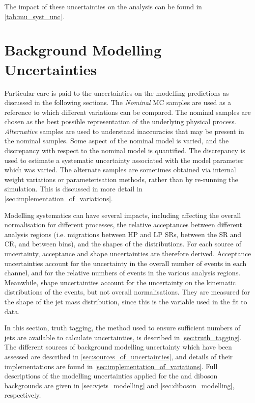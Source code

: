 The impact of these uncertainties on the analysis can be found in \cref{tab:mu_syst_unc}.



\section{Background Modelling Uncertainties}\label{sec:vhbb_modelling}

Particular care is paid to the uncertainties on the modelling predictions as discussed in the following sections.
The \textit{Nominal} MC samples are used as a reference to which different variations can be compared.
The nominal samples are chosen as the best possible representation of the underlying physical process.
\textit{Alternative} samples are used to understand inaccuracies that may be present in the nominal samples.
Some aspect of the nominal model is varied, and the discrepancy with respect to the nominal model is quantified.
The discrepancy is used to estimate a systematic uncertainty associated with the model parameter which was varied.
The alternate samples are sometimes obtained via internal weight variations or parameterisation methods, rather than by re-running the simulation.
This is discussed in more detail in \cref{sec:implementation_of_variations}.

Modelling systematics can have several impacts, including affecting the overall normalisation for different processes, the relative acceptances between different analysis regions (i.e. migrations between HP and LP SRs, between the SR and CR, and between \pTV bins), and the shapes of the \mJ distributions.
For each source of uncertainty, acceptance and shape uncertainties are therefore derived.
Acceptance uncertainties account for the uncertainty in the overall number of events in each channel, and for the relative numbers of events in the various analysis regions.
Meanwhile, shape uncertainties account for the uncertainty on the kinematic distributions of the events, but not overall normalisations.
They are measured for the shape of the \largeR jet mass distribution, since this is the variable used in the fit to data.

In this section, truth tagging, the method used to ensure sufficient numbers of jets are available to calculate uncertainties, is described in \cref{sec:truth_tagging}.
The different sources of background modelling uncertainty which have been assessed are described in \cref{sec:sources_of_uncertainties}, and details of their implementations are found in \cref{sec:implementation_of_variations}.
Full descriptions of the modelling uncertainties applied for the \Vjets and diboson backgrounds are given in \cref{sec:vjets_modelling} and \cref{sec:diboson_modelling}, respectively.


